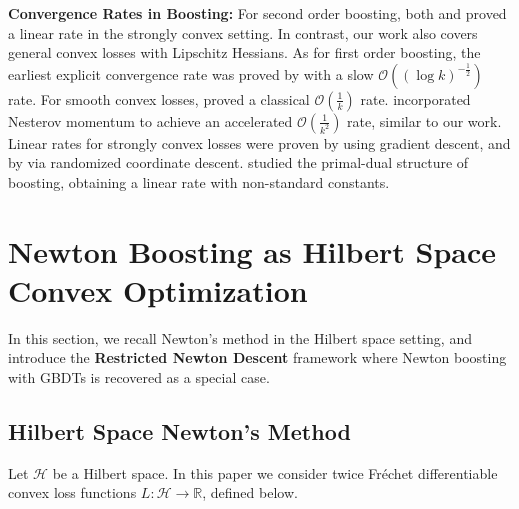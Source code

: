 \documentclass{article}
\theoremstyle{plain}
\theoremstyle{definition}
\theoremstyle{remark}
\begin{document}
\textbf{Convergence Rates in Boosting:} For second order boosting, both \citet{2014AConvergenceRateAnalysisForLogitBoostMARTAndTheirVariant} and \citet{2020SnapBoostAHeterogeneousBoostingMachine} proved a linear rate in the strongly convex setting. In contrast, our work also covers general convex losses with Lipschitz Hessians. As for first order boosting, the earliest explicit convergence rate was proved by \citet{2006SomeTheoryForGeneralizedBoostingAlgorithms} with a slow $\mathcal{O}((\log k)^{-\frac{1}{2}})$ rate. For smooth convex losses, \citet{2014AConvergenceRateAnalysisForLogitBoostMARTAndTheirVariant} proved a classical $\mathcal{O}(\frac{1}{k})$ rate.  \citet{2020AcceleratingGradientBoostingMachines} incorporated Nesterov momentum to achieve an accelerated $\mathcal{O}(\frac{1}{k^2})$ rate, similar to our work. Linear rates for strongly convex losses were proven by \citet{2011GeneralizedBoostingAlgorithmsForConvexOptimization} using gradient descent, and by \citet{2020RandomizedGradientBoostingMachine} via randomized coordinate descent.  \citet{2012APrimalDualConvergenceAnalysisOfBoosting} studied the primal-dual structure of boosting, obtaining a linear rate with non-standard constants.











\section{Newton Boosting as Hilbert Space Convex Optimization}
In this section, we recall Newton's method in the Hilbert space setting, and introduce the \textbf{Restricted Newton Descent} framework where Newton boosting with GBDTs is recovered as a special case.

\subsection{Hilbert Space Newton's Method}

Let $\mathcal{H}$ be a Hilbert space. In this paper we consider twice Fréchet differentiable convex loss functions $L : \mathcal{H} \to \mathbb{R}$, defined below.
\end{document}
